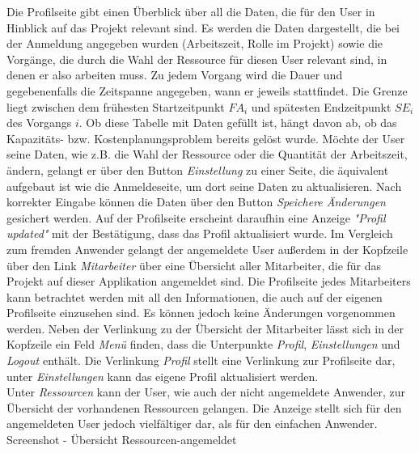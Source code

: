 \documentclass[a4paper,12pt,parskip,bibtotoc,liststotoc]{article}
\begin{document}
Die Profilseite gibt einen Überblick über all die Daten, die für den User in Hinblick auf das Projekt relevant sind. Es werden die Daten dargestellt, die bei der Anmeldung angegeben wurden (Arbeitszeit, Rolle im Projekt) sowie die Vorgänge, die durch die Wahl der Ressource für diesen User relevant sind, in denen er also arbeiten muss. Zu jedem Vorgang wird die Dauer und gegebenenfalls die Zeitspanne angegeben, wann er jeweils stattfindet. Die Grenze liegt zwischen dem frühesten Startzeitpunkt $FA_{i}$ und spätesten Endzeitpunkt $SE_{i}$ des Vorgangs $i$. Ob diese Tabelle mit Daten gefüllt ist, hängt davon ab, ob das Kapazitäts- bzw. Kostenplanungsproblem bereits gelöst wurde. Möchte der User seine Daten, wie z.B. die Wahl der Ressource oder die Quantität der Arbeitszeit, ändern, gelangt er über den Button \textit{Einstellung} zu einer Seite, die äquivalent aufgebaut ist wie die Anmeldeseite, um dort seine Daten zu aktualisieren. Nach korrekter Eingabe können die Daten über den Button \textit{Speichere Änderungen} gesichert werden. Auf der Profilseite erscheint daraufhin eine Anzeige \textit{"Profil updated"} mit der Bestätigung, dass das Profil aktualisiert wurde. Im Vergleich zum fremden Anwender gelangt der angemeldete User außerdem in der Kopfzeile über den Link \textit{Mitarbeiter} über eine Übersicht aller Mitarbeiter, die für das Projekt auf dieser Applikation angemeldet sind. Die Profilseite jedes Mitarbeiters kann betrachtet werden mit all den Informationen, die auch auf der eigenen Profilseite einzusehen sind. Es können jedoch keine Änderungen vorgenommen werden. Neben der Verlinkung zu der Übersicht der Mitarbeiter lässt sich in der Kopfzeile ein Feld \textit{Menü} finden, dass die Unterpunkte \textit{Profil}, \textit{Einstellungen} und \textit{Logout} enthält. Die Verlinkung \textit{Profil} stellt eine Verlinkung zur Profilseite dar, unter \textit{Einstellungen} kann das eigene Profil aktualisiert werden.\\
Unter \textit{Ressourcen} kann der User, wie auch der nicht angemeldete Anwender, zur Übersicht der vorhandenen Ressourcen gelangen. Die Anzeige stellt sich für den angemeldeten User jedoch vielfältiger dar, als für den einfachen Anwender.\\

Screenshot - Übersicht Ressourcen-angemeldet\\
\end{document}
